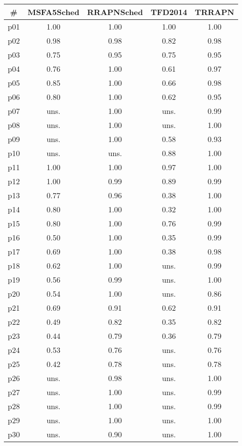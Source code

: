 \begin{tabular}{ccccc}
\toprule
\textbf{\#} & \textbf{MSFA5Sched} & \textbf{RRAPNSched} & \textbf{TFD2014} & \textbf{TRRAPN}\\
\midrule
p01 & 1.00 & 1.00 & 1.00 & 1.00\\
p02 & 0.98 & 0.98 & 0.82 & 0.98\\
p03 & 0.75 & 0.95 & 0.75 & 0.95\\
p04 & 0.76 & 1.00 & 0.61 & 0.97\\
p05 & 0.85 & 1.00 & 0.66 & 0.98\\
p06 & 0.80 & 1.00 & 0.62 & 0.95\\
p07 & uns. & 1.00 & uns. & 0.99\\
p08 & uns. & 1.00 & uns. & 1.00\\
p09 & uns. & 1.00 & 0.58 & 0.93\\
p10 & uns. & uns. & 0.88 & 1.00\\
p11 & 1.00 & 1.00 & 0.97 & 1.00\\
p12 & 1.00 & 0.99 & 0.89 & 0.99\\
p13 & 0.77 & 0.96 & 0.38 & 1.00\\
p14 & 0.80 & 1.00 & 0.32 & 1.00\\
p15 & 0.80 & 1.00 & 0.76 & 0.99\\
p16 & 0.50 & 1.00 & 0.35 & 0.99\\
p17 & 0.69 & 1.00 & 0.38 & 0.98\\
p18 & 0.62 & 1.00 & uns. & 0.99\\
p19 & 0.56 & 0.99 & uns. & 1.00\\
p20 & 0.54 & 1.00 & uns. & 0.86\\
p21 & 0.69 & 0.91 & 0.62 & 0.91\\
p22 & 0.49 & 0.82 & 0.35 & 0.82\\
p23 & 0.44 & 0.79 & 0.36 & 0.79\\
p24 & 0.53 & 0.76 & uns. & 0.76\\
p25 & 0.42 & 0.78 & uns. & 0.78\\
p26 & uns. & 0.98 & uns. & 1.00\\
p27 & uns. & 1.00 & uns. & 0.99\\
p28 & uns. & 1.00 & uns. & 0.99\\
p29 & uns. & 1.00 & uns. & 1.00\\
p30 & uns. & 0.90 & uns. & 1.00\\
\bottomrule
\end{tabular}

